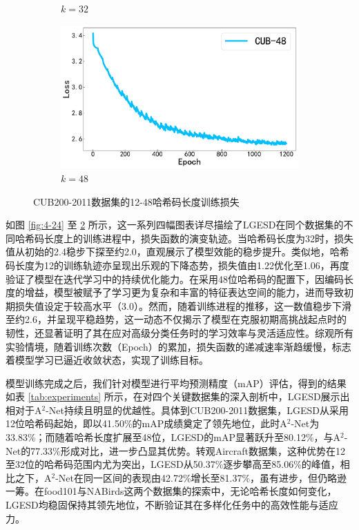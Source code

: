 \begin{figure}[h]
\begin{subfigure}{0.48\textwidth}
    \caption{$k=32$}\label{fig:4-26}
  \end{subfigure}
  \hfil
  \begin{subfigure}{0.48\textwidth}
    \centering
    \includegraphics[width=\linewidth]{./Img/CUB-48.pdf}
    \caption{$k=48$}\label{fig:4-27}
  \end{subfigure}
  \caption{CUB200-2011数据集的12-48哈希码长度训练损失}
  \label{fig:4-28}
\end{figure}

如图 \ref{fig:4-24} 至 \ref{fig:4-27} 所示，这一系列四幅图表详尽描绘了LGESD在同个数据集的不同哈希码长度上的训练进程中，损失函数的演变轨迹。当哈希码长度为32时，损失值从初始的2.4稳步下探至约2.0，直观展示了模型效能的稳步提升。类似地，哈希码长度为12的训练轨迹亦呈现出乐观的下降态势，损失值由1.22优化至1.06，再度验证了模型在迭代学习中的持续优化能力。在采用48位哈希码的配置下，因编码长度的增益，模型被赋予了学习更为复杂和丰富的特征表达空间的能力，进而导致初期损失值设定于较高水平（3.0）。然而，随着训练进程的推移，这一数值稳步下滑至约2.6，并呈现平稳趋势，这一动态不仅揭示了模型在克服初期高挑战起点时的韧性，还显著证明了其在应对高级分类任务时的学习效率与灵活适应性。综观所有实验情境，随着训练次数（Epoch）的累加，损失函数的递减速率渐趋缓慢，标志着模型学习已逼近收敛状态，实现了训练目标。

模型训练完成之后，我们针对模型进行平均预测精度（mAP）评估，得到的结果如表 \ref{tab:experiments} 所示，在对四个关键数据集的深入剖析中，LGESD展示出相对于A${}^2$-Net持续且明显的优越性。具体到CUB200-2011数据集，LGESD从采用12位哈希码起始，即以41.50\%的mAP成绩奠定了领先地位，此时A${}^2$-Net为33.83\%；而随着哈希长度扩展至48位，LGESD的mAP显著跃升至80.12\%，与A${}^2$-Net的77.33\%形成对比，进一步凸显其优势。转观Aircraft数据集，这种优势在12至32位的哈希码范围内尤为突出，LGESD从50.37\%逐步攀高至85.06\%的峰值，相比之下，A${}^2$-Net在同一区间的表现由42.72\%增长至81.37\%，虽有进步，但仍略逊一筹。在food101与NABirds这两个数据集的探索中，无论哈希长度如何变化，LGESD均稳固保持其领先地位，不断验证其在多样化任务中的高效性能与适应力。

